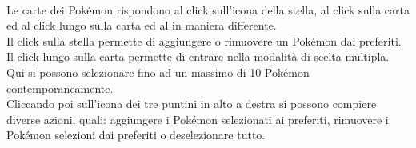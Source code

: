 \documentclass[a4paper,11pt]{article}
\begin{document}
  \paragraph{}
  Le carte dei Pokémon rispondono al click sull’icona della stella, al click sulla carta ed al click lungo sulla carta ed al in maniera differente.\\
Il click sulla stella permette di aggiungere o rimuovere un Pokémon dai preferiti.\\
Il click lungo sulla carta permette di entrare nella modalità di scelta multipla. Qui si possono selezionare fino ad un massimo di 10 Pokémon contemporaneamente.\\
Cliccando poi sull’icona dei tre puntini in alto a destra si possono compiere diverse azioni, quali: aggiungere i Pokémon selezionati ai preferiti, rimuovere i Pokémon selezioni dai preferiti o deselezionare tutto.\\
\end{document}

